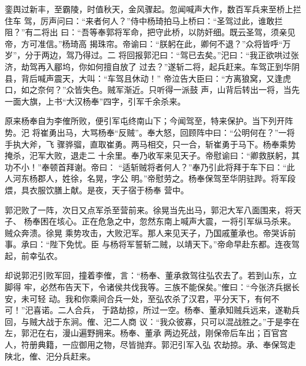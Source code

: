 銮舆过新丰，至霸陵，时值秋天，金风骤起。忽闻喊声大作，数百军兵来至桥上拦住车
驾，厉声问曰：“来者何人？”侍中杨琦拍马上桥曰：“圣驾过此，谁敢拦阻？”有二将出
曰：“吾等奉郭将军命，把守此桥，以防奸细。既云圣驾，须亲见帝，方可准信。”杨琦高
揭珠帘。帝谕曰：“朕躬在此，卿何不退？”众将皆呼“万岁”，分于两边，驾乃得过。二
将回报郭汜曰：“驾已去矣。”汜曰：“我正欲哄过张济，劫驾再入郿坞，你如何擅自放了
过去？”遂斩二将，起兵赶来。车驾正到华阴县，背后喊声震天，大叫：“车驾且休动！”
帝泣告大臣曰：“方离狼窝，又逢虎口，如之奈何？”众皆失色。贼军渐近。只听得一派鼓
声，山背后转出一将，当先一面大旗，上书“大汉杨奉”四字，引军千余杀来。

原来杨奉自为李傕所败，便引军屯终南山下；今闻驾至，特来保护。当下列开阵势。汜
将崔勇出马，大骂杨奉“反贼”。奉大怒，回顾阵中曰：“公明何在？”一将手执大斧，飞
骤骅骝，直取崔勇。两马相交，只一合，斩崔勇于马下。杨奉乘势掩杀，汜军大败，退走二
十余里。奉乃收军来见天子。帝慰谕曰：“卿救朕躬，其功不小！”奉顿首拜谢。帝曰：
“适斩贼将者何人？”奉乃引此将拜于车下曰：“此人河东杨郡人，姓徐，名晃，字公
明。”帝慰劳之。杨奉保驾至华阴驻跸。将军段煨，具衣服饮膳上献。是夜，天子宿于杨奉
营中。

郭汜败了一阵，次日又点军杀至营前来。徐晃当先出马，郭汜大军八面围来，将天子、
杨奉困在垓心。正在危急之中，忽然东南上喊声大震，一将引军纵马杀来。贼众奔溃。徐晃
乘势攻击，大败汜军。那人来见天子，乃国戚董承也。帝哭诉前事。承曰：“陛下免忧。臣
与杨将军誓斩二贼，以靖天下。”帝命早赴东都。连夜驾起，前幸弘农。

却说郭汜引败军回，撞着李傕，言：“杨奉、董承救驾往弘农去了。若到山东，立脚得
牢，必然布告天下，令诸侯共伐我等。三族不能保矣。”傕曰：“今张济兵据长安，未可轻
动。我和你乘间合兵一处，至弘农杀了汉君，平分天下，有何不可！”汜喜诺。二人合兵，
于路劫掠，所过一空。杨奉、董承知贼兵远来，遂勒兵回，与贼大战于东涧。傕、汜二人商
议：“我众彼寡，只可以混战胜之。”于是李在左，郭汜在右，漫山遍野拥来。杨奉、董承
两边死战，刚保帝后车出；百官宫人，符册典籍，一应御用之物，尽皆抛弃。郭汜引军入弘
农劫掠。承、奉保驾走陕北，傕、汜分兵赶来。

